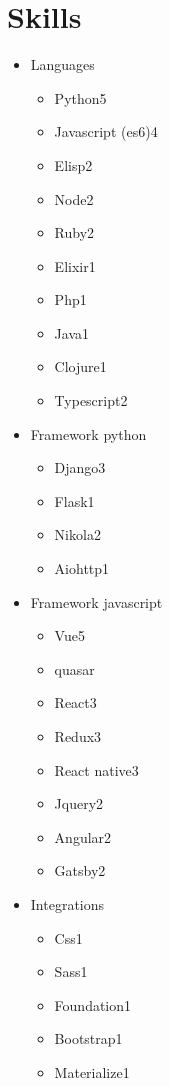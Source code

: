\documentclass[11pt,letter,sans]{moderncv}
\begin{document}
\section{Skills}
  \begin{itemize}
      \item Languages
      \begin{itemize}
\item Python\hfill 5\item Javascript (es6)\hfill 4\item Elisp\hfill 2\item Node\hfill 2\item Ruby\hfill 2\item Elixir\hfill 1\item Php\hfill 1\item Java\hfill 1\item Clojure\hfill 1\item Typescript\hfill 2\end{itemize}
      \item Framework python
      \begin{itemize}
\item Django\hfill 3\item Flask\hfill 1\item Nikola\hfill 2\item Aiohttp\hfill 1\end{itemize}
      \item Framework javascript
      \begin{itemize}
\item Vue\hfill 5\item quasar\hfill \item React\hfill 3\item Redux\hfill 3\item React native\hfill 3\item Jquery\hfill 2\item Angular\hfill 2\item Gatsby\hfill 2\end{itemize}
      \item Integrations
      \begin{itemize}
\item Css\hfill 1\item Sass\hfill 1\item Foundation\hfill 1\item Bootstrap\hfill 1\item Materialize\hfill 1\end{itemize}

\end{itemize}
\end{document}
